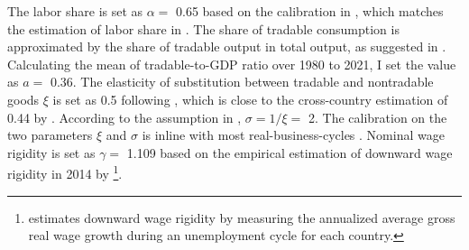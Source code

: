 The labor share is set as $\alpha=$ 0.65 based on the calibration in \citet*{Jegajeevan-Sri-Lanka-DSGE}, which matches the estimation of labor share in \citet{duma2007sri}. The share of tradable consumption is approximated by the share of tradable output in total output, as suggested in \citet{Uribe-Schmitt-Grohe-textbook}. Calculating the mean of tradable-to-GDP ratio over 1980 to 2021, I set the value as $a =$ 0.36. The elasticity of substitution between tradable and nontradable goods $\xi$ is set as 0.5 following \citet{Uribe-Schmitt-Grohe-textbook}, which is close to the cross-country estimation of 0.44 by \citet*{Stockman-Tesar-95}. According to the assumption in , $\sigma=1/\xi=$ 2. The calibration on the two parameters $\xi$ and $\sigma$ is inline with most real-business-cycles \citep{Uribe-Schmitt-Grohe-textbook,Na-18}. Nominal wage rigidity is set as $\gamma=$ 1.109 based on the empirical estimation of downward wage rigidity in 2014 by \citet*{wage-rigidity-data}\footnote{\citet{wage-rigidity-data} estimates downward wage rigidity by measuring the annualized average gross real wage growth during an unemployment cycle for each country.}.

